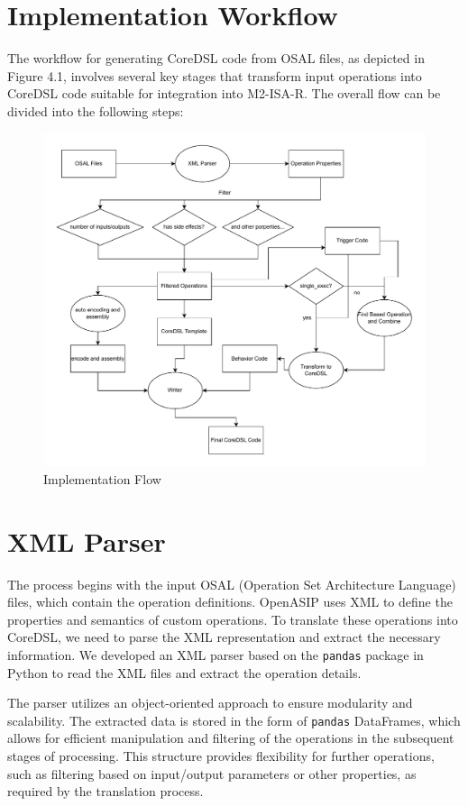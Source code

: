 \section{Implementation Workflow}

The workflow for generating CoreDSL code from OSAL files, as depicted in Figure 4.1, involves several key stages that transform input operations into CoreDSL code suitable for integration into M2-ISA-R. The overall flow can be divided into the following steps:

\begin{figure}[h]
  \centering
  \includegraphics[width=\linewidth]{figures/flow.pdf}
  \caption{Implementation Flow}
\end{figure}

\section{XML Parser}

The process begins with the input OSAL (Operation Set Architecture Language) files, which contain the operation definitions. OpenASIP uses XML to define the properties and semantics of custom operations. To translate these operations into CoreDSL, we need to parse the XML representation and extract the necessary information. We developed an XML parser based on the \texttt{pandas} package in Python to read the XML files and extract the operation details.

The parser utilizes an object-oriented approach to ensure modularity and scalability. The extracted data is stored in the form of \texttt{pandas} DataFrames, which allows for efficient manipulation and filtering of the operations in the subsequent stages of processing. This structure provides flexibility for further operations, such as filtering based on input/output parameters or other properties, as required by the translation process.

